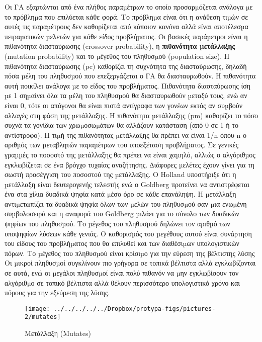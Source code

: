  Οι ΓΑ εξαρτώνται από ένα πλήθος παραµέτρων το οποίο προσαρµόζεται ανάλογα µε το πρόβληµα που επιλύεται κάθε φορά. Το πρόβληµα είναι ότι η ανάθεση τιµών σε αυτές τις παραµέτρους δεν καθορίζεται από κάποιον κανόνα αλλά είναι αποτέλεσµα πειραµατικών µελετών για κάθε είδος προβλήµατος. Οι βασικές παράµετροι είναι η πιθανότητα διασταύρωσης (crossover probability), η \label{muta} \textbf{πιθανότητα µετάλλαξης} (mutation probability) και το µέγεθος του πληθυσµού (population size). Η πιθανότητα διασταύρωσης (pc) καθορίζει τη συχνότητα της διασταύρωσης, δηλαδή πόσα µέλη του πληθυσµού που επεξεργάζεται ο ΓΑ θα διασταυρωθούν. Η πιθανότητα αυτή ποικίλει ανάλογα µε το είδος του προβλήµατος. Πιθανότητα διασταύρωσης ίση µε 1 σηµαίνει όλα τα µέλη του πληθυσµού θα διασταυρωθούν µεταξύ τους, ενώ αν είναι 0, τότε οι απόγονοι θα είναι πιστά αντίγραφα των γονέων εκτός αν συµβούν αλλαγές στη φάση της µετάλλαξης. Η πιθανότητα µετάλλαξης (pm) καθορίζει το πόσο συχνά τα γονίδια των χρωµοσωµάτων θα αλλάζουν κατάσταση (από 0 σε 1 ή το αντίστροφο). Η τιµή της πιθανότητας µετάλλαξης θα πρέπει να είναι 1/n όπου n ο αριθµός των µεταβλητών παραµέτρων του υποεξέταση προβλήµατος. Σε γενικές γραµµές το ποσοστό της µετάλλαξης θα πρέπει να είναι χαµηλό, αλλιώς ο αλγόριθµος εγκλωβίζεται σε ένα βρόγχο τυχαίας αναζήτησης.
 ∆ιάφορες µελέτες έχουν γίνει για τη σωστή προσέγγιση του ποσοστού της µετάλλαξης. Ο Holland υποστήριξε ότι η µετάλλαξη είναι δευτερογενής τελεστής ενώ ο Goldberg προτείνει να αντιστρέφεται ένα στα χίλια δυαδικά ψηφία κατά µέσο όρο σε κάθε επανάληψη. Η µετάλλαξη αντιµετωπίζει τα δυαδικά ψηφία όλων των µελών του πληθυσµού σαν µια ενωµένη συµβολοσειρά και η αναφορά του Goldberg µιλάει για το σύνολο των δυαδικών ψηφίων του πληθυσµού. Το µέγεθος του πληθυσµού δηλώνει τον αριθµό των υποψηφίων λύσεων κάθε γενιάς. Ο καθορισµός του µεγέθους αυτού είναι συνάρτηση του είδους του προβλήµατος που θα επιλυθεί και των διαθέσιµων υπολογιστικών πόρων. Το µέγεθος του πληθυσµού είναι κρίσιµο για την εύρεση της βέλτιστης λύσης Οι µικροί πληθυσµοί συγκλίνουν πιο γρήγορα σε τοπικά βέλτιστα αλλά εγκλωβίζονται σε αυτά, ενώ οι µεγάλοι πληθυσµοί είναι πολύ πιθανόν να µην εγκλωβίσουν τον αλγόριθµο σε τοπικό βέλτιστα αλλά θέλουν περισσότερο υπολογιστικό χρόνο και πόρους για την εξεύρεση της λύσης.
 
 \begin{figure}
 	\centering
 	\texttt{[image: ../../../../../Dropbox/protypa-figs/pictures-2/mutates]}
 	\caption{Μετάλλαξη (Mutates) }
 	\label{fig:Mutates}
 \end{figure}
 

